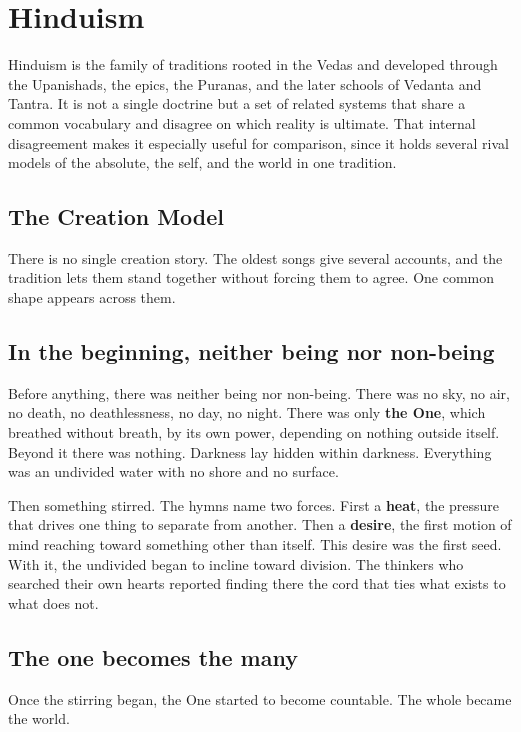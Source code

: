 \section{Hinduism}

Hinduism is the family of traditions rooted in the Vedas and developed through the Upanishads, the epics, the Puranas, and the later schools of Vedanta and Tantra. It is not a single doctrine but a set of related systems that share a common vocabulary and disagree on which reality is ultimate. That internal disagreement makes it especially useful for comparison, since it holds several rival models of the absolute, the self, and the world in one tradition.

\subsection{The Creation Model}

There is no single creation story. The oldest songs give several accounts, and the tradition lets them stand together without forcing them to agree. One common shape appears across them.

\subsection{In the beginning, neither being nor non-being}

Before anything, there was neither being nor non-being. There was no sky, no air, no death, no deathlessness, no day, no night. There was only \textbf{the One}, which breathed without breath, by its own power, depending on nothing outside itself. Beyond it there was nothing. Darkness lay hidden within darkness. Everything was an undivided water with no shore and no surface.

Then something stirred. The hymns name two forces. First a \textbf{heat}, the pressure that drives one thing to separate from another. Then a \textbf{desire}, the first motion of mind reaching toward something other than itself. This desire was the first seed. With it, the undivided began to incline toward division. The thinkers who searched their own hearts reported finding there the cord that ties what exists to what does not.

\subsection{The one becomes the many}

Once the stirring began, the One started to become countable. The whole became the world.

